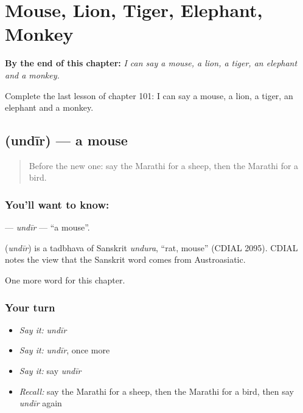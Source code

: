 
\chapter{Mouse, Lion, Tiger, Elephant, Monkey}
\label{ch:mr-mouse-lion-tiger-elephant-monkey}

\begin{chapteropening}
\textbf{By the end of this chapter:} \emph{I can say a mouse, a lion, a tiger, an elephant and a monkey.}

Complete the last lesson of chapter 101: I can say a mouse, a lion, a tiger, an elephant and a monkey.
\end{chapteropening}

\section[\texorpdfstring{\mr{उंदीर} (undīr)}{उंदीर (undīr)}]{ (undīr) — a mouse}

\label{lesson:MR-C101-undir}



\begin{quote}
Before the new one: say the Marathi for a sheep, then the Marathi for a bird.
\end{quote}

\subsection*{You'll want to know: }
\textbf{} — \emph{undīr} — \textquotedblleft{}a mouse\textquotedblright{}.

\begin{cousinweb}
\textbf{} (\emph{undīr}) is a tadbhava of Sanskrit \emph{undura}, \textquotedblleft{}rat, mouse\textquotedblright{} (CDIAL 2095). CDIAL notes the view that the Sanskrit word comes from Austroasiatic.
\end{cousinweb}

\begin{grammarlens}[title={What you've built}]
One more word for this chapter.
\end{grammarlens}

\subsection*{Your turn}
\begin{itemize}
\raggedright
  \item \emph{Say it:} \emph{undīr}
  \item \emph{Say it:} \emph{undīr}, once more
  \item \emph{Say it:} say \emph{undīr}
  \item \emph{Recall:} say the Marathi for a sheep, then the Marathi for a bird, then say \emph{undīr} again
\end{itemize}


